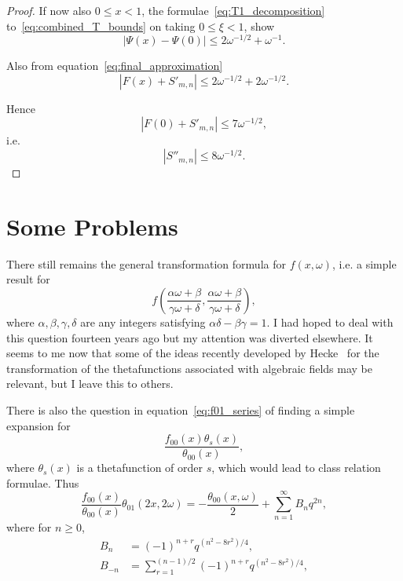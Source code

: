 \documentclass[12pt]{article}
\theoremstyle{remark}
\begin{document}
\begin{proof}
If now also $0 \leq x < 1$, the formulae~\eqref{eq:T1_decomposition} to~\eqref{eq:combined_T_bounds} on taking $0 \leq \xi < 1$, show
\begin{equation}\label{eq:psi_difference_bound}
|\Psi(x) - \Psi(0)| \leq 2\omega^{-1/2} + \omega^{-1}.
\end{equation}

Also from equation~\eqref{eq:final_approximation}
\begin{equation}\label{eq:F_S_bound}
|F(x) + S'_{m,n}| \leq 2\omega^{-1/2} + 2\omega^{-1/2}.
\end{equation}

Hence
\begin{equation}\label{eq:F_zero_bound}
|F(0) + S'_{m,n}| \leq 7\omega^{-1/2},
\end{equation}
i.e.
\begin{equation}\label{eq:S_final_bound}
|S''_{m,n}| \leq 8\omega^{-1/2}.
\end{equation}
\end{proof}

\section{Some Problems}\label{sec:problems}

There still remains the general transformation formula for $f(x, \omega)$, i.e. a simple result for
\begin{equation}\label{eq:transformation_problem}
f\left(\frac{\alpha\omega + \beta}{\gamma\omega + \delta}, \frac{\alpha\omega + \beta}{\gamma\omega + \delta}\right),
\end{equation}
where $\alpha, \beta, \gamma, \delta$ are any integers satisfying $\alpha\delta - \beta\gamma = 1$. I had hoped to deal with this question fourteen years ago but my attention was diverted elsewhere. It seems to me now that some of the ideas recently developed by Hecke~\cite{Hecke1926a,Hecke1926b} for the transformation of the thetafunctions associated with algebraic fields may be relevant, but I leave this to others.

There is also the question in equation~\eqref{eq:f01_series} of finding a simple expansion for
\begin{equation}\label{eq:expansion_problem}
\frac{f_{00}(x) \theta_s(x)}{\theta_{00}(x)},
\end{equation}
where $\theta_s(x)$ is a thetafunction of order $s$, which would lead to class relation formulae. Thus~\cite{Mordell1916}
\begin{equation}\label{eq:class_relation_example1}
\frac{f_{00}(x)}{\theta_{00}(x)} \theta_{01}(2x, 2\omega) = -\frac{\theta_{00}(x, \omega)}{2} + \sum_{n=1}^\infty B_n q^{2n},
\end{equation}
where for $n \geq 0$,
\begin{align}
B_n &= (-1)^{n+r} q^{(n^2-8r^2)/4}, \label{eq:B_n_definition}\\
B_{-n} &= \sum_{r=1}^{(n-1)/2} (-1)^{n+r} q^{(n^2-8r^2)/4}, \label{eq:B_minus_n_definition}
\end{align}
\end{document}
